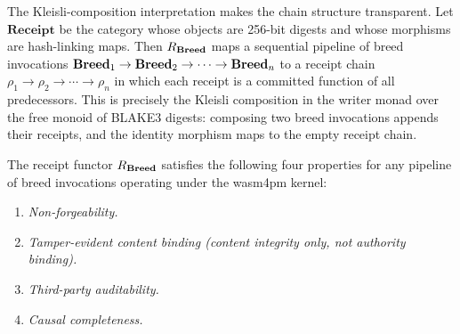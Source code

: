 The Kleisli-composition interpretation makes the chain structure transparent.  Let
$\mathbf{Receipt}$ be the category whose objects are 256-bit digests and whose morphisms
are hash-linking maps.  Then $R_{\mathbf{Breed}}$ maps a sequential pipeline of breed invocations
$\mathbf{Breed}_1 \to \mathbf{Breed}_2 \to \cdots \to \mathbf{Breed}_n$ to a receipt chain
$\rho_1 \to \rho_2 \to \cdots \to \rho_n$ in which each receipt is a committed function
of all predecessors.  This is precisely the Kleisli composition \cite{maclane1971,moggi1991monads} in the
writer monad over the free monoid of BLAKE3 digests: composing two breed invocations
appends their receipts, and the identity morphism maps to the empty receipt chain.

\label{sec:trust-properties}
\begin{theorem}
\label{thm:civilizational-trust}
The receipt functor $R_{\mathbf{Breed}}$ satisfies the following four properties for any pipeline
of breed invocations operating under the wasm4pm kernel:

\begin{enumerate}[label=(\roman*)]
  \item \emph{Non-forgeability.}
  \item \emph{Tamper-evident content binding (content integrity only, not authority binding).}
  \item \emph{Third-party auditability.}
  \item \emph{Causal completeness.}
\end{enumerate}
\end{theorem}

